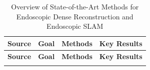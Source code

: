 \begin{footnotesize}
\begin{longtable}{>{\raggedright\arraybackslash}p{}>{\raggedright\arraybackslash}p{}>{\raggedright\arraybackslash}p{}>{\raggedright\arraybackslash}p{}}
    \caption{Overview of State-of-the-Art Methods for Endoscopic Dense Reconstruction and Endoscopic SLAM}\label{tab:sota_slam} \\
    \toprule
    \textbf{Source} & \textbf{Goal} & \textbf{Methods} & \textbf{Key Results} \\
    \midrule
    \endfirsthead
    \toprule
    \textbf{Source} & \textbf{Goal} & \textbf{Methods} & \textbf{Key Results} \\
    \midrule
    \endhead
    \bottomrule
    \endfoot


\end{longtable}
\end{footnotesize}
